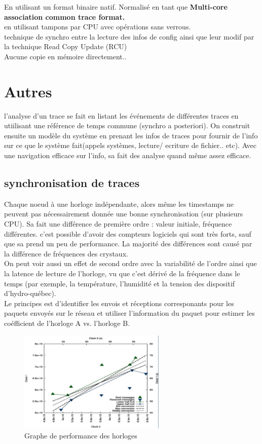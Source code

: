 \documentclass[oneside]{book}
\begin{document}
En utilisant un format binaire natif. Normalisé en tant que \textbf{Multi-core association common trace format.}\\

en utilisant  tampons par CPU avec opérations sans verrous. \\

technique de synchro entre la lecture des infos de config ainsi que leur modif par la technique Read Copy Update (RCU)\\

Aucune copie en mémoire directement..
\section{Autres}
l'analyse d'un trace se fait en listant les événements de différentes traces en utiilisant une référence de temps commune (synchro a posteriori). On construit ensuite un modèle du système en prenant les infos de traces pour fournir de l'info sur ce que le système fait(appels systèmes, lecture/ ecriture de fichier.. etc). Avec une navigation efficace sur l'info, sa fait des analyse quand même assez efficace.\\

\subsection{synchronisation de traces}
Chaque noeud à une horloge indépendante, alors même les timestamps ne peuvent pas nécessairement donnée une bonne synchronisation (sur plusieurs CPU). Sa fait une différence de première ordre : valeur initiale, fréquence différentes. c'est possible d'avoir des compteurs logiciels qui sont très forts, sauf que sa prend un peu de performance. La majorité des différences sont causé par la différence de fréquences des crystaux.\\

On peut voir aussi un effet de second ordre avec la variabilité de l'ordre ainsi que la latence de lecture de l'horloge, vu que c'est dérivé de la fréquence dans le temps (par exemple, la température, l'humidité et la tension des dispositif d'hydro-québec).\\

Le principes est d'identifier les envois et réceptions corresponants pour les paquets envoyés sur le réseau et utiliser l'information du paquet pour estimer les coéfficient de l'horloge A vs. l'horloge B.\\

\begin{figure}[!ht]
\centering
\includegraphics[width = 7cm]{convex_hull.png}
\caption{Graphe de performance des horloges}
\end{figure}
\end{document}
